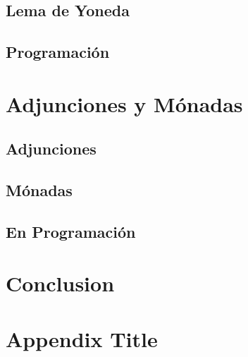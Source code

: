 \documentclass[11pt]{book}
\begin{document}
\section{Lema de Yoneda}

\section{Programación}

\chapter{Adjunciones y Mónadas}
\section{Adjunciones}


\section{Mónadas}


\section{En Programación}


\chapter{Conclusion}

\printbibliography

\appendix
\chapter{Appendix Title}
\end{document}
